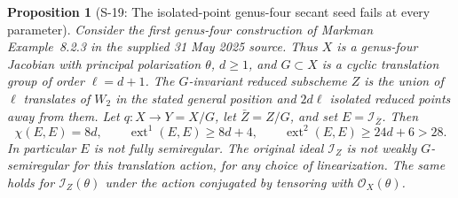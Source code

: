 \documentclass[11pt,a4paper]{article}
\newtheorem{proposition}[theorem]{Proposition}
\theoremstyle{definition}
\begin{document}
\begin{proposition}[S-19: The isolated-point genus-four secant seed fails at every parameter]
\label{prop:semireg-markman-genus-four-points}
Consider the first genus-four construction of Markman
Example~8.2.3 in the supplied 31 May 2025 source. Thus $X$ is
a genus-four Jacobian with principal polarization $\theta$,
$d\ge1$, and $G\subset X$ is a cyclic translation group of
order $\ell=d+1$. The $G$-invariant reduced subscheme $Z$ is
the union of $\ell$ translates of $W_2$ in the stated general
position and $2d\ell$ isolated reduced points away from them.
Let $q:X\to Y=X/G$, let $\bar Z=Z/G$, and set
$E=\mathcal I_{\bar Z}$. Then
\[
 \chi(E,E)=8d,\qquad
 \operatorname{ext}^1(E,E)\ge8d+4,\qquad
 \operatorname{ext}^2(E,E)\ge24d+6>28.
 \tag{S19.1}
\]
In particular $E$ is not fully semiregular. The original ideal
$\mathcal I_Z$ is not weakly $G$-semiregular for this translation
action, for any choice of linearization. The same holds for
$\mathcal I_Z(\theta)$ under the action conjugated by tensoring
with $\mathcal O_X(\theta)$.
\end{proposition}
\end{document}
